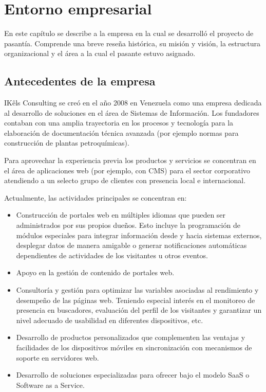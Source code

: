 \chapter{Entorno empresarial} \label{entornoEmpresarial}
En este capítulo se describe a la empresa en la cual se desarrolló el proyecto de pasantía. Comprende una breve reseña histórica, su misión y visión, la estructura organizacional y el área a la cual el pasante estuvo asignado.

\section{Antecedentes de la empresa} \label{antecedentesEmpresa}
IKêls Consulting \cite{ikelsAbout}  se creó en el año 2008 en Venezuela como una empresa dedicada al desarrollo de soluciones en el área de Sistemas de Información. Los fundadores contaban con una amplia trayectoria en los procesos y tecnología para la elaboración de documentación técnica avanzada (por ejemplo normas para construcción de plantas petroquímicas).

Para aprovechar la experiencia previa los productos y servicios se concentran en el área de aplicaciones web (por ejemplo, con \ac{CMS}) para el sector corporativo atendiendo a un selecto grupo de clientes con presencia local e internacional.

Actualmente, las actividades principales se concentran en:

\begin{itemize}
  \item Construcción de portales web en múltiples idiomas que pueden ser administrados por sus propios dueños. Esto incluye la programación de módulos especiales para integrar información desde y hacia sistemas externos, desplegar datos de manera amigable o generar notificaciones automáticas dependientes de actividades de los visitantes u otros eventos.
  \item Apoyo en la gestión de contenido de portales web.
  \item Consultoría y gestión para optimizar las variables asociadas al rendimiento y desempeño de las páginas web. Teniendo especial interés en el monitoreo de presencia en buscadores, evaluación del perfil de los visitantes y garantizar un nivel adecuado de usabilidad en diferentes dispositivos, etc.
  \item Desarrollo de productos personalizados que complementen las ventajas y facilidades de los dispositivos móviles en sincronización con mecanismos de soporte en servidores web.
  \item Desarrollo de soluciones especializadas para ofrecer bajo el modelo SaaS o Software as a Service.
\end{itemize}

